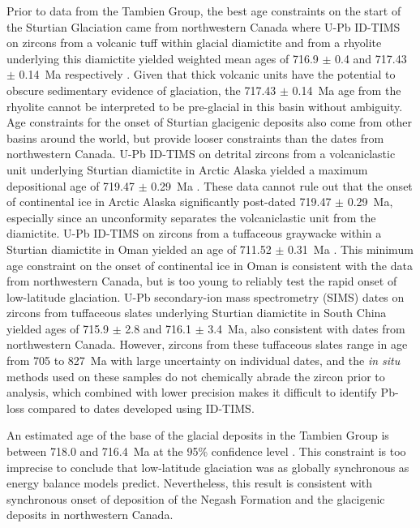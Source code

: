 Prior to data from the Tambien Group, the best age constraints on the start of the Sturtian Glaciation came from northwestern Canada where U-Pb ID-TIMS on zircons from a volcanic tuff within glacial diamictite and from a rhyolite underlying this diamictite yielded weighted mean ages of 716.9 $\pm$ 0.4 and 717.43 $\pm$ 0.14~Ma respectively \citep{Macdonald2010a, Macdonald2018a}. Given that thick volcanic units have the potential to obscure sedimentary evidence of glaciation, the 717.43 $\pm$ 0.14~Ma age from the rhyolite cannot be interpreted to be pre-glacial in this basin without ambiguity. Age constraints for the onset of Sturtian glacigenic deposits also come from other basins around the world, but provide looser constraints than the dates from northwestern Canada. U-Pb ID-TIMS on detrital zircons from a volcaniclastic unit underlying Sturtian diamictite in Arctic Alaska yielded a maximum depositional age of 719.47 $\pm$ 0.29~Ma \citep{Cox2015a}. These data cannot rule out that the onset of continental ice in Arctic Alaska significantly post-dated 719.47 $\pm$ 0.29~Ma, especially since an unconformity separates the volcaniclastic unit from the diamictite. U-Pb ID-TIMS on zircons from a tuffaceous graywacke within a Sturtian diamictite in Oman yielded an age of 711.52 $\pm$ 0.31~Ma \citep{Brasier2000a, Bowring2007a}. This minimum age constraint on the onset of continental ice in Oman is consistent with the data from northwestern Canada, but is too young to reliably test the rapid onset of low-latitude glaciation. U-Pb secondary-ion mass spectrometry (SIMS) dates on zircons from tuffaceous slates underlying Sturtian diamictite in South China yielded ages of 715.9 $\pm$ 2.8 and 716.1 $\pm$ 3.4~Ma, also consistent with dates from northwestern Canada. However, zircons from these tuffaceous slates range in age from 705 to 827~Ma \citep{Lan2014a} with large uncertainty on individual dates, and the \textit{in situ} methods used on these samples do not chemically abrade the zircon prior to analysis, which combined with lower precision makes it difficult to identify Pb-loss compared to dates developed using ID-TIMS.

An estimated age of the base of the glacial deposits in the Tambien Group is between 718.0 and 716.4~Ma at the 95\% confidence level \citep{MacLennan2018a}. This constraint is too imprecise to conclude that low-latitude glaciation was as globally synchronous as energy balance models predict. Nevertheless, this result is consistent with synchronous onset of deposition of the Negash Formation and the glacigenic deposits in northwestern Canada.

